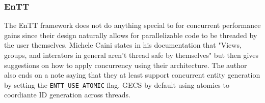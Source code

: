 \subsubsection{EnTT}
The EnTT framework does not do anything special to for concurrent performance gains since their design naturally allows for parallelizable code to be threaded by the user themselves. Michele Caini states in his documentation that "Views, groups, and interators in general aren't thread safe by themselves" but then gives suggestions on how to apply concurrency using their architecture. The author also ends on a note saying that they at least support concurrent entity generation by setting the \texttt{ENTT\_USE\_ATOMIC} flag.\cite{EnTT_multithreading} GECS by default using atomics to coordiante ID generation across threads.